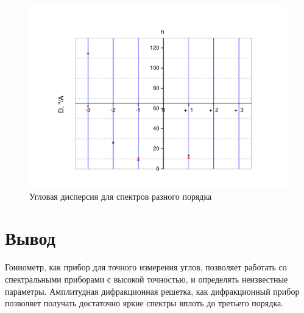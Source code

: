 \documentclass[a4paper,12pt]{article}
\begin{document}
		\begin{figure}[h]
			\caption{Угловая дисперсия для спектров разного порядка}
			\centering
			\label{pic2}
			\includegraphics[width = 0.8\linewidth]{graph2}
		\end{figure}
	
	\section{Вывод}
	
		Гониометр, как прибор для точного измерения углов, позволяет работать со спектральными приборами с высокой точностью, и определять неизвестные параметры. Амплитудная дифракционная решетка, как дифракционный прибор позволяет получать достаточно яркие спектры вплоть до третьего порядка.
\end{document}
